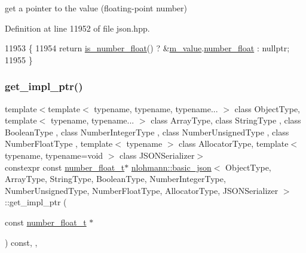 get a pointer to the value (floating-\/point number) 



Definition at line 11952 of file json.\+hpp.


\begin{DoxyCode}
11953     \{
11954         \textcolor{keywordflow}{return} \hyperlink{classnlohmann_1_1basic__json_a33b4bf898b857c962e798fc7f6e86e70}{is\_number\_float}() ? &\hyperlink{classnlohmann_1_1basic__json_aeb0814f76966f99290cb29e127c90a77}{m\_value}.\hyperlink{unionnlohmann_1_1basic__json_1_1json__value_ad003495e39e78b8096e0b6fc690d146f}{number\_float} : \textcolor{keyword}{nullptr};
11955     \}
\end{DoxyCode}
\mbox{\label{classnlohmann_1_1basic__json_abbec23daef5fbb5b8bff6a481e5a7160}} 
\subsubsection{\texorpdfstring{get\+\_\+impl\+\_\+ptr()}{get\_impl\_ptr()}\hspace{0.1cm}{\footnotesize\ttfamily [14/14]}}
{\footnotesize\ttfamily template$<$template$<$ typename, typename, typename... $>$ class Object\+Type, template$<$ typename, typename... $>$ class Array\+Type, class String\+Type , class Boolean\+Type , class Number\+Integer\+Type , class Number\+Unsigned\+Type , class Number\+Float\+Type , template$<$ typename $>$ class Allocator\+Type, template$<$ typename, typename=void $>$ class J\+S\+O\+N\+Serializer$>$ \\
constexpr const \hyperlink{classnlohmann_1_1basic__json_a88d6103cb3620410b35200ee8e313d97}{number\+\_\+float\+\_\+t}$\ast$ \hyperlink{classnlohmann_1_1basic__json}{nlohmann\+::basic\+\_\+json}$<$ Object\+Type, Array\+Type, String\+Type, Boolean\+Type, Number\+Integer\+Type, Number\+Unsigned\+Type, Number\+Float\+Type, Allocator\+Type, J\+S\+O\+N\+Serializer $>$\+::get\+\_\+impl\+\_\+ptr (\begin{DoxyParamCaption}\item[{const \hyperlink{classnlohmann_1_1basic__json_a88d6103cb3620410b35200ee8e313d97}{number\+\_\+float\+\_\+t} $\ast$}]{ }\end{DoxyParamCaption}) const\hspace{0.3cm}{\ttfamily [inline]}, {\ttfamily [private]}, {\ttfamily [noexcept]}}



